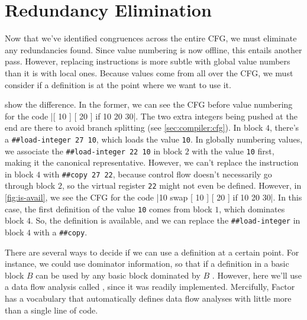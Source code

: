 \section{Redundancy Elimination}\label{sec:vn:avail}

Now that we've identified congruences across the entire \gls{CFG}, we must
eliminate any redundancies found.  Since value numbering is now offline, this
entails another pass.  However, replacing instructions is more subtle with
global value numbers than it is with local ones.  Because values come from all
over the \gls{CFG}, we must consider if a definition is  at the
point where we want to use it.  


 show the difference.  In the former, we can
see the \gls{CFG} before value numbering for the code
%
\factor|[ 10 ] [ 20 ] if 10 20 30|.
%
The two extra integers being pushed at the end are there to avoid branch
splitting (see \cref{sec:compiler:cfg}).  In block $4$, there's a
%
\Verb|##load-integer 27 10|,
%
which loads the value \Verb|10|.  In globally numbering values, we associate
the
%
\Verb|##load-integer 22 10|
%
in block $2$ with the value \Verb|10| first, making it the canonical
representative.  However, we can't replace the instruction in block $4$ with
%
\Verb|##copy 27 22|,
%
because control flow doesn't necessarily go through block $2$, so the virtual
register \Verb|22| might not even be defined.  However, in
\cref{fig:is-avail}, we see the \gls{CFG} for the code
%
\factor|10 swap [ 10 ] [ 20 ] if 10 20 30|.
%
In this case, the first definition of the value \Verb|10| comes from block
$1$, which dominates block $4$.  So, the definition is available, and we can
replace the \Verb|##load-integer| in block $4$ with a \Verb|##copy|.

There are several ways to decide if we can use a definition at a certain point.
For instance, we could use dominator information, so that if a definition in a
basic block $B$ can be used by any basic block dominated by $B$
\autocite{Simpson}.  However, here we'll use a data flow analysis called
, since it was readily implemented.
Mercifully, Factor has a vocabulary that automatically defines data flow
analyses with little more than a single line of code.


